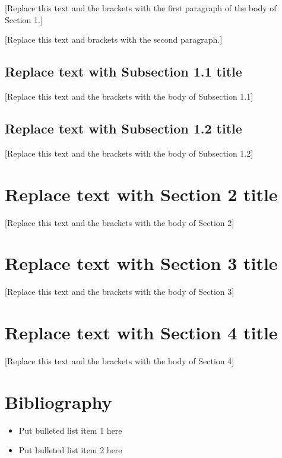 \documentclass{article}
\begin{document}
[Replace this text and the brackets with the first paragraph of 
the body of Section 1.] 


[Replace this text and brackets with the second paragraph.]


\subsection{Replace text with Subsection 1.1 title}


[Replace this text and the brackets with the body of Subsection 1.1] 


\subsection{Replace text with Subsection 1.2 title}


[Replace this text and the brackets with the body of Subsection 1.2] 

\section{Replace text with Section 2 title}


[Replace this text and the brackets with the body of Section 2] 


\section{Replace text with Section 3 title}


[Replace this text and the brackets with the body of Section 3] 


\section{Replace text with Section 4 title}

 [Replace this text and the brackets with the body of Section 4] 




\section*{Bibliography}

\begin{itemize}

\item Put bulleted list item 1 here

\item Put bulleted list item 2 here

\end{itemize}
\end{document}
